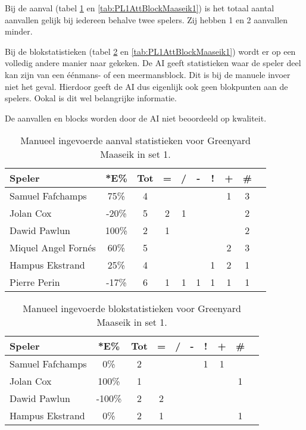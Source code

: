 Bij de aanval (tabel \ref{tab:PL1AttMaaseikMan1} en \ref{tab:PL1AttBlockMaaseik1}) is het totaal aantal aanvallen gelijk bij iedereen behalve twee spelers. Zij hebben 1 en 2 aanvallen minder.

Bij de blokstatistieken (tabel \ref{tab:PL1BlockMaaseikMan1} en \ref{tab:PL1AttBlockMaaseik1}) wordt er op een volledig andere manier naar gekeken. De AI geeft statistieken waar de speler deel kan zijn van een éénmans- of een meermansblock. Dit is bij de manuele invoer niet het geval. Hierdoor geeft de AI dus eigenlijk ook geen blokpunten aan de spelers. Ookal is dit wel belangrijke informatie.

De aanvallen en blocks worden door de AI niet beoordeeld op kwaliteit.

\begin{table}[ht!]
    \centering
    \scriptsize
    \begin{tabular}{|l|c|c|c|c|c|c|c|c|c|} \hline
        \textbf{Speler} & *E\% & Tot & = & / & - & ! & + & \# \\ \hline
        Samuel Fafchamps & 75\% & 4 &  &  &  &  & 1 & 3 \\ 
        Jolan Cox & -20\% & 5 & 2 & 1 &  &  &  & 2 \\ 
        Dawid Pawlun  & 100\% & 2 & 1 &  &  &  &  & 2 \\ 
        Miquel Angel Fornés & 60\% & 5 &  &  &  &  & 2 & 3 \\
        Hampus Ekstrand & 25\% & 4 &  &  &  & 1 & 2 & 1 \\ 
        Pierre Perin & -17\% & 6 & 1 & 1 & 1 & 1 & 1 & 1 \\ \hline
    \end{tabular}
    \caption[Manueel ingevoerde aanvalsstatistieken voor Greenyard Maaseik in set 1]{\label{tab:PL1AttMaaseikMan1}Manueel ingevoerde aanval statistieken voor Greenyard Maaseik in set 1.}
\end{table}

\begin{table}[ht!]
    \centering
    \scriptsize
    \begin{tabular}{|l|c|c|c|c|c|c|c|c|c|} \hline
        \textbf{Speler} & *E\% & Tot & = & / & - & ! & + & \# \\ \hline
        Samuel Fafchamps & 0\% & 2 &  &  &  & 1 & 1 &  \\ 
        Jolan Cox & 100\% & 1 &  &  &  &  &  & 1 \\ 
        Dawid Pawlun & -100\% & 2 & 2 &  &  &  &  &  \\ 
        Hampus Ekstrand & 0\% & 2 & 1 &  &  &  &  & 1 \\ \hline
    \end{tabular}
    \caption[Manueel ingevoerde blokstatistieken voor Greenyard Maaseik in set 1]{\label{tab:PL1BlockMaaseikMan1}Manueel ingevoerde blokstatistieken voor Greenyard Maaseik in set 1.}
\end{table}

